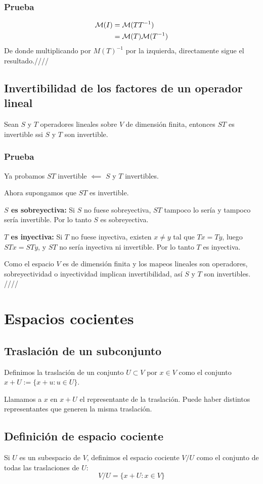\documentclass{article}
\begin{document}
\subsubsection*{Prueba}
\begin{align*}
    \mathcal{M}(I)&=\mathcal{M}(TT^{-1})\\
    &=\mathcal{M}(T)\mathcal{M}(T^{-1})
\end{align*}
De donde multiplicando por $M(T)^{-1}$ por la izquierda,
directamente sigue el resultado.\hfill ////

\subsection{Invertibilidad de los factores de un operador lineal}
Sean $S$ y $T$ operadores lineales sobre $V$ de dimensión finita,
entonces $ST$ es invertible ssi $S$ y $T$ son invertible.
\subsubsection*{Prueba}
Ya probamos $ST$ invertible $\impliedby$ $S$ y $T$ invertibles.

Ahora supongamos que $ST$ es invertible.

\textbf{$S$ es sobreyectiva:} Si $S$ no fuese sobreyectiva, $ST$ tampoco lo sería y tampoco sería
invertible. Por lo tanto $S$ es sobreyectiva.

\textbf{$T$ es inyectiva:} Si $T$ no fuese inyectiva, existen $x\neq y$ tal que $Tx=Ty$,
luego $STx=STy$, y $ST$ no sería inyectiva ni invertible. Por lo
tanto $T$ es inyectiva.

Como el espacio $V$ es de dimensión finita y los mapeos lineales son 
operadores, sobreyectividad o inyectividad implican invertibilidad, así 
$S$ y $T$ son invertibles.
\hfill ////
\newpage

\section{Espacios cocientes}
\subsection{Traslación de un subconjunto}
Definimos la traslación de un conjunto $U\subset V$ por $x\in V$ como
el conjunto $x+U:=\{x+u: u\in U\}$.

Llamamos a $x$ en $x+U$ el representante de la traslación. Puede haber distintos representantes que generen la misma traslación.

\subsection{Definición de espacio cociente}
Si $U$ es un subespacio de $V$, definimos el espacio cociente
$V/U$ como el conjunto de todas las traslaciones de $U$:
$$V/U=\{x+U:x\in V\}$$
\end{document}
